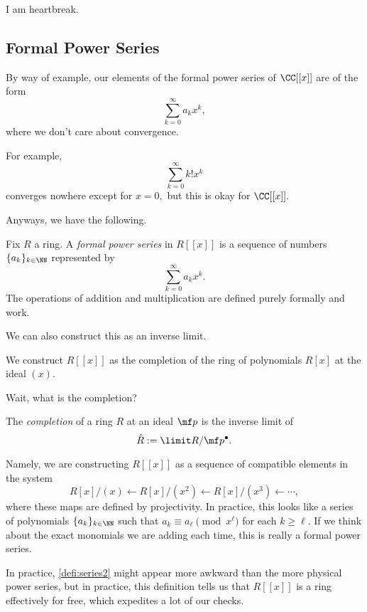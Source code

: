 \documentclass[../notes.tex]{subfiles}
\begin{document}
















I am heartbreak.

\subsection{Formal Power Series}
By way of example, our elements of the formal power series of $\CC[[x]]$ are of the form
\[\sum_{k=0}^\infty a_kx^k,\]
where we don't care about convergence.
\begin{example}
	For example,
	\[\sum_{k=0}^\infty k!x^k\]
	converges nowhere except for $x=0,$ but this is okay for $\CC[[x]].$
\end{example}
Anyways, we have the following.
\begin{definition}
	Fix $R$ a ring. A \textit{formal power series} in $R[[x]]$ is a sequence of numbers $\{a_k\}_{k\in\NN}$ represented by
	\[\sum_{k=0}^\infty a_kx^k.\]
	The operations of addition and multiplication are defined purely formally and work.
\end{definition}
We can also construct this as an inverse limit.
\begin{definition} \label{defi:series2}
	We construct $R[[x]]$ as the completion of the ring of polynomials $R[x]$ at the ideal $(x).$
\end{definition}
Wait, what is the completion?
\begin{definition}[Completion]
	The \textit{completion} of a ring $R$ at an ideal $\mf p$ is the inverse limit of
	\[\hat R:=\limit R/\mf p^\bullet.\]
\end{definition}
Namely, we are constructing $R[[x]]$ as a sequence of compatible elements in the system
\[R[x]/(x)\leftarrow R[x]/\left(x^2\right)\leftarrow R[x]/\left(x^3\right)\leftarrow\cdots,\]
where these maps are defined by projectivity. In practice, this looks like a series of polynomials $\{a_k\}_{k\in\NN}$ such that $a_k\equiv a_\ell\pmod{x^\ell}$ for each $k\ge\ell.$ If we think about the exact monomials we are adding each time, this is really a formal power series.
\begin{remark}[Nir]
	In practice, \autoref{defi:series2} might appear more awkward than the more physical power series, but in practice, this definition tells us that $R[[x]]$ is a ring effectively for free, which expedites a lot of our checks.
\end{remark}
\end{document}
